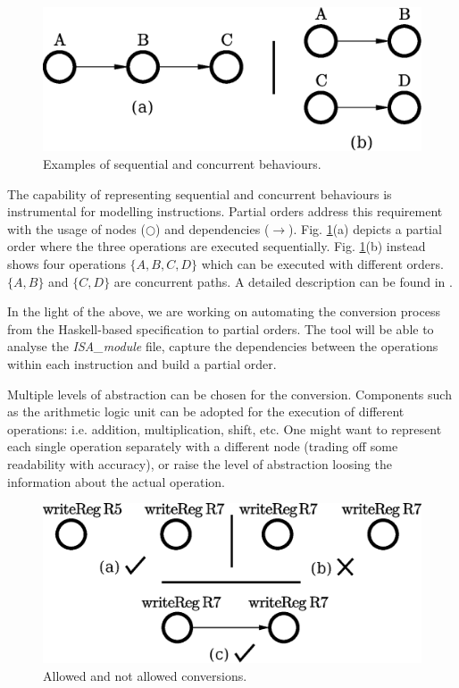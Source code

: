 \documentclass[conference]{IEEEtran}
\begin{document}
\begin{figure}[ht!]
\begin{center}
	\includegraphics[scale=0.5]{IMG/pos.eps}
	\caption{Examples of sequential and concurrent behaviours.}
	\label{fig:pos}
\end{center}
\end{figure}

The capability of representing sequential and concurrent behaviours is instrumental for
modelling instructions. Partial orders address this requirement with the usage of nodes
($\bigcirc$) and dependencies ($\rightarrow$). Fig. \ref{fig:pos}(a) depicts a partial order
where the three operations are executed sequentially. Fig. \ref{fig:pos}(b) instead shows
four operations $\lbrace A,B,C,D \rbrace$ which can be executed with different orders. 
$\lbrace A,B \rbrace$ and $\lbrace C,D \rbrace$ are concurrent paths. A detailed
description can be found in \cite{andreyPhd}.

In the light of the above, we are working on automating the conversion process from the
Haskell-based specification to partial orders. The tool will be able to analyse the
\textit{ISA\_module} file, capture the dependencies between the operations within each
instruction and build a partial order. 

Multiple levels of abstraction can be chosen for the conversion. Components such as the
arithmetic logic unit can be adopted for the execution of
different operations: i.e. addition, multiplication, shift, etc. One might want to represent
each single operation separately with a different node 
(trading off some readability with accuracy), or raise the
level of abstraction loosing the information about the actual operation.

\begin{figure}[ht!]
\begin{center}
	\includegraphics[width=\linewidth]{IMG/depPO.eps}
	\caption{Allowed and not allowed conversions.}
	\label{fig:depPO}
\end{center}
\end{figure}
\end{document}
